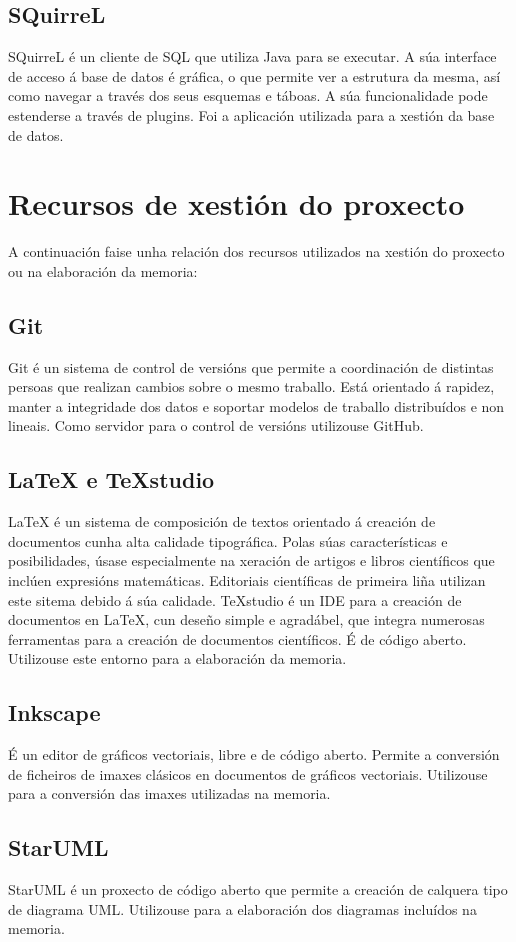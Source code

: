 \subsection{SQuirreL}
SQuirreL é un cliente de SQL que utiliza Java para se executar. A súa interface de acceso á base de datos é gráfica, o que permite ver a estrutura da mesma, así como navegar a través dos seus esquemas e táboas. A súa funcionalidade pode estenderse a través de plugins. Foi a aplicación utilizada para a xestión da base de datos.


\section{Recursos de xestión do proxecto}
A continuación faise unha relación dos recursos utilizados na xestión do proxecto ou na elaboración da memoria:

\subsection{Git}
Git é un sistema de control de versións que permite a coordinación de distintas persoas que realizan cambios sobre o mesmo traballo. Está orientado á rapidez, manter a integridade dos datos e soportar modelos de traballo distribuídos e non lineais. Como servidor para o control de versións utilizouse GitHub.


\subsection{LaTeX e TeXstudio}
LaTeX é un sistema de composición de textos orientado á creación de documentos cunha alta calidade tipográfica. Polas súas características e posibilidades, úsase especialmente na xeración de artigos e libros científicos que inclúen expresións matemáticas. Editoriais científicas de primeira liña utilizan este sitema debido á súa calidade.
TeXstudio é un IDE para a creación de documentos en LaTeX, cun deseño simple e agradábel, que integra numerosas ferramentas para a creación de documentos científicos. É de código aberto. Utilizouse este entorno para a elaboración da memoria.


\subsection{Inkscape}
É un editor de gráficos vectoriais, libre e de código aberto. Permite a conversión de ficheiros de imaxes clásicos en documentos de gráficos vectoriais. Utilizouse para a conversión das imaxes utilizadas na memoria.


\subsection{StarUML}
StarUML é un proxecto de código aberto que permite a creación de calquera tipo de diagrama UML. Utilizouse para a elaboración dos diagramas incluídos na memoria.
